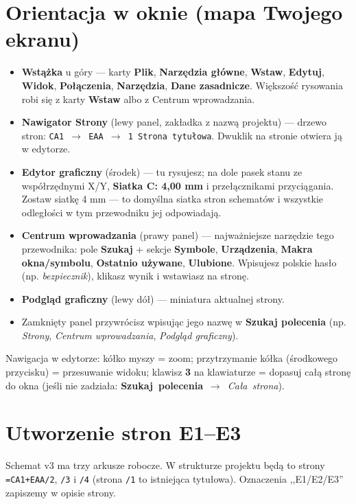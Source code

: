 \documentclass[11pt,a4paper]{article}
\newcommand{\ui}[1]{\textbf{#1}}                    %
\newcommand{\szukaj}[1]{\mbox{\ui{Szukaj polecenia} $\to$ \emph{#1}}} %
\begin{document}
\section{Orientacja w oknie (mapa Twojego ekranu)}

\begin{itemize}
\item \textbf{Wstążka} u góry --- karty \ui{Plik}, \ui{Narzędzia główne}, \ui{Wstaw},
\ui{Edytuj}, \ui{Widok}, \ui{Połączenia}, \ui{Narzędzia}, \ui{Dane zasadnicze}. Większość rysowania
robi się z karty \ui{Wstaw} albo z Centrum wprowadzania.
\item \textbf{Nawigator Strony} (lewy panel, zakładka z nazwą projektu) --- drzewo stron:
\texttt{CA1 $\to$ EAA $\to$ 1 Strona tytułowa}. Dwuklik na stronie otwiera ją w edytorze.
\item \textbf{Edytor graficzny} (środek) --- tu rysujesz; na dole pasek stanu ze współrzędnymi
X/Y, \ui{Siatka C: 4,00 mm} i przełącznikami przyciągania. Zostaw siatkę 4 mm --- to domyślna
siatka stron schematów i wszystkie odległości w tym przewodniku jej odpowiadają.
\item \textbf{Centrum wprowadzania} (prawy panel) --- najważniejsze narzędzie tego przewodnika:
pole \ui{Szukaj} + sekcje \ui{Symbole}, \ui{Urządzenia}, \ui{Makra okna/symbolu},
\ui{Ostatnio używane}, \ui{Ulubione}. Wpisujesz polskie hasło (np. \emph{bezpiecznik}),
klikasz wynik i wstawiasz na stronę.
\item \textbf{Podgląd graficzny} (lewy dół) --- miniatura aktualnej strony.
\item Zamknięty panel przywrócisz wpisując jego nazwę w \ui{Szukaj polecenia}
(np. \emph{Strony}, \emph{Centrum wprowadzania}, \emph{Podgląd graficzny}).
\end{itemize}

Nawigacja w edytorze: kółko myszy = zoom; przytrzymanie kółka (środkowego przycisku) =
przesuwanie widoku; klawisz \textbf{3} na klawiaturze = dopasuj całą stronę do okna
(jeśli nie zadziała: \szukaj{Cała strona}).

\section{Utworzenie stron E1--E3}
\label{sec:strony}

Schemat v3 ma trzy arkusze robocze. W strukturze projektu będą to strony
\texttt{=CA1+EAA/2}, \texttt{/3} i \texttt{/4} (strona \texttt{/1} to istniejąca tytułowa).
Oznaczenia ,,E1/E2/E3'' zapiszemy w opisie strony.
\end{document}

